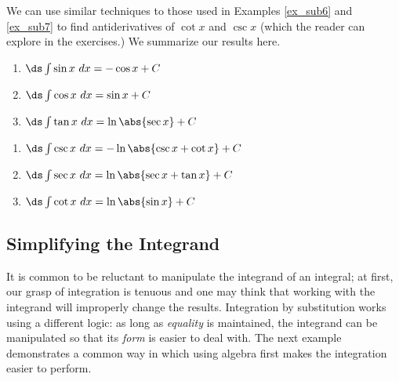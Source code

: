 We can use similar techniques to those used in Examples \ref{ex_sub6} and \ref{ex_sub7} to find antiderivatives of $\cot x$ and $\csc x$ (which the reader can explore in the exercises.) We summarize our results here.

\setboxwidth{20pt}
{\begin{minipage}{.45\specialboxlength}\small
	\begin{enumerate}
	\item	$\ds \int \sin x \ dx = -\cos x +C$
	\item	$\ds\int \cos x\ dx = \sin x + C$
	\item	$\ds \int \tan x\ dx = \ln\abs{\sec x}+C$
\end{enumerate}
\end{minipage}%
\begin{minipage}{.55\specialboxlength}\small
	\begin{enumerate}\addtocounter{enumi}{3}
	\item	$\ds \int \csc x \ dx = -\ln\abs{\csc x+\cot x} +C$
	\item	$\ds\int \sec x\ dx = \ln\abs{\sec x+\tan x} + C$
	\item	$\ds \int \cot x\ dx = \ln\abs{\sin x}+C$
\end{enumerate}
\end{minipage}}


\subsection*{Simplifying the Integrand}

It is common to be reluctant to manipulate the integrand of an integral; at first, our grasp of integration is tenuous and one may think that working with the integrand will improperly change the results. Integration by substitution works using a different logic: as long as \textit{equality} is maintained, the integrand can be manipulated so that its \textit{form} is easier to deal with. The next example demonstrates a common way in which using algebra first makes the integration easier to perform.

